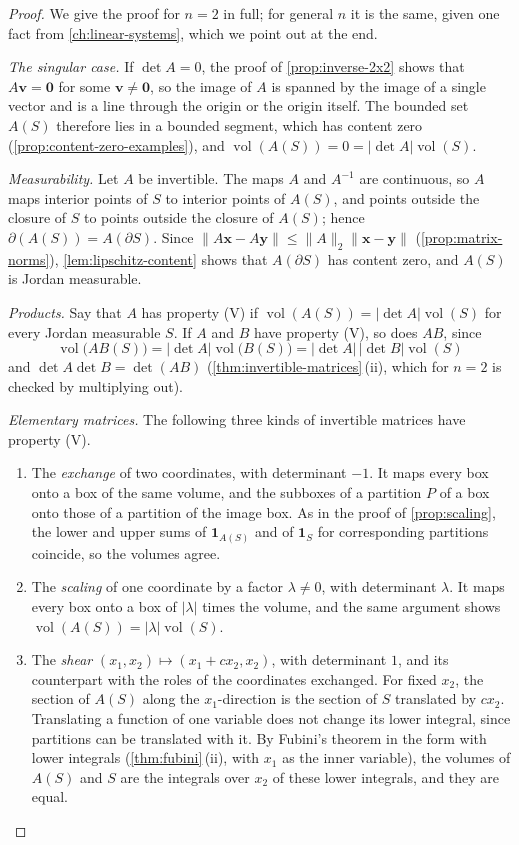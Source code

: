 \begin{proof}
We give the proof for $n=2$ in full; for general $n$ it is the same, given one fact from \cref{ch:linear-systems}, which we point out at the end.

\emph{The singular case.} If $\det A=0$, the proof of \cref{prop:inverse-2x2} shows that $A\mathbf v=\mathbf0$ for some $\mathbf v\ne\mathbf0$, so the image of $A$ is spanned by the image of a single vector and is a line through the origin or the origin itself. The bounded set $A(S)$ therefore lies in a bounded segment, which has content zero (\cref{prop:content-zero-examples}), and $\operatorname{vol}(A(S))=0=|\det A|\operatorname{vol}(S)$.

\emph{Measurability.} Let $A$ be invertible. The maps $A$ and $A^{-1}$ are continuous, so $A$ maps interior points of $S$ to interior points of $A(S)$, and points outside the closure of $S$ to points outside the closure of $A(S)$; hence $\partial(A(S))=A(\partial S)$. Since $\|A\mathbf x-A\mathbf y\|\le\|A\|_2\|\mathbf x-\mathbf y\|$ (\cref{prop:matrix-norms}), \cref{lem:lipschitz-content} shows that $A(\partial S)$ has content zero, and $A(S)$ is Jordan measurable.

\emph{Products.} Say that $A$ has property (V) if $\operatorname{vol}(A(S))=|\det A|\operatorname{vol}(S)$ for every Jordan measurable $S$. If $A$ and $B$ have property (V), so does $AB$, since
\[
\operatorname{vol}\bigl(AB(S)\bigr)=|\det A|\operatorname{vol}\bigl(B(S)\bigr)=|\det A|\,|\det B|\operatorname{vol}(S)
\]
and $\det A\det B=\det(AB)$ (\cref{thm:invertible-matrices}\,(ii), which for $n=2$ is checked by multiplying out).

\emph{Elementary matrices.} The following three kinds of invertible matrices have property (V).
\begin{enumerate}
\item The \emph{exchange} of two coordinates, with determinant $-1$. It maps every box onto a box of the same volume, and the subboxes of a partition $P$ of a box onto those of a partition of the image box. As in the proof of \cref{prop:scaling}, the lower and upper sums of $\mathbf 1_{A(S)}$ and of $\mathbf 1_S$ for corresponding partitions coincide, so the volumes agree.
\item The \emph{scaling} of one coordinate by a factor $\lambda\ne0$, with determinant $\lambda$. It maps every box onto a box of $|\lambda|$ times the volume, and the same argument shows $\operatorname{vol}(A(S))=|\lambda|\operatorname{vol}(S)$.
\item The \emph{shear} $(x_1,x_2)\mapsto(x_1+cx_2,x_2)$, with determinant $1$, and its counterpart with the roles of the coordinates exchanged. For fixed $x_2$, the section of $A(S)$ along the $x_1$-direction is the section of $S$ translated by $cx_2$. Translating a function of one variable does not change its lower integral, since partitions can be translated with it. By Fubini's theorem in the form with lower integrals (\cref{thm:fubini}\,(ii), with $x_1$ as the inner variable), the volumes of $A(S)$ and $S$ are the integrals over $x_2$ of these lower integrals, and they are equal.
\end{enumerate}


\end{proof}
